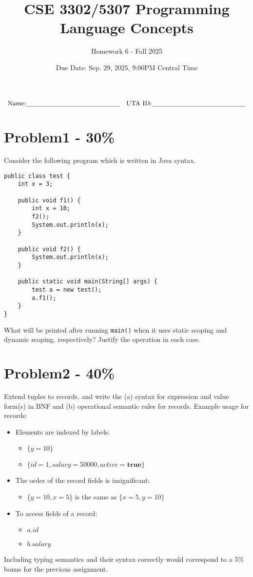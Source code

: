 \documentclass{article}
\newcommand{\answerboxbig}{
    \vspace{20cm} %
}
\newcommand{\studentinfo}{
    $$\begin{array}{cc}
        \noindent \text{Name:} \underline{\hspace{5cm}} &
            \text{UTA ID:} \underline{\hspace{5cm}}\\
    \end{array}$$
}
\begin{document}
\title{CSE 3302/5307 Programming Language Concepts}
\author{Homework 6 - Fall 2025}
\date{Due Date: Sep. 29, 2025, 9:00PM Central Time}
\maketitle
\thispagestyle{fancy}

\studentinfo


\section*{Problem1 - 30\%}

Consider the following program which is written in Java syntax.
\begin{lstlisting}
public class test {
    int x = 3;

    public void f1() {
        int x = 10;
        f2();
        System.out.println(x);
    }

    public void f2() {
        System.out.println(x);
    }

    public static void main(String[] args) {
        test a = new test();
        a.f1();
    }
}
\end{lstlisting}
What will be printed after running \texttt{main()} when it uses static scoping and dynamic scoping, respectively? Justify the operation in each case.

\answerboxbig

\section*{Problem2 - 40\%}

Extend tuples to records, and write the (a) syntax for expression and value form(s) in BNF and (b) operational semantic rules for records.
Example usage for records:
\begin{itemize}
    \item Elements are indexed by labels:
    \begin{itemize}
        \item $\{y=10\}$
        \item $\{id=1,salary=50000,active=\mathbf{true}\}$
    \end{itemize}
    \item The order of the record fields is insignificant:
    \begin{itemize}
        \item $\{y=10,x=5\}$ is the same as $\{x=5,y=10\}$
    \end{itemize}
    \item To access fields of a record:
    \begin{itemize}
        \item $a.id$
        \item $b.salary$
    \end{itemize}
\end{itemize}
Including typing semantics and their syntax correctly would correspond to a 5\% bonus for the previous assignment.
\answerboxbig
\end{document}
